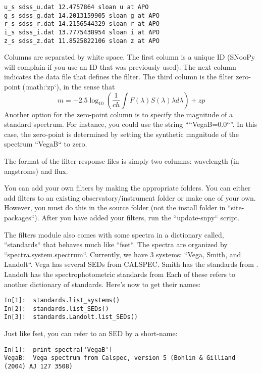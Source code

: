 \begin{verbatim}
u_s sdss_u.dat 12.4757864 sloan u at APO 
g_s sdss_g.dat 14.2013159905 sloan g at APO 
r_s sdss_r.dat 14.2156544329 sloan r at APO 
i_s sdss_i.dat 13.7775438954 sloan i at APO 
z_s sdss_z.dat 11.8525822106 sloan z at APO
\end{verbatim}Columns are separated by white space. The first column is a unique
ID (SNooPy will complain if you use an ID that was previously used).
The next column indicates the data file that defines the filter. The
third column is the filter zero-point (:math:`zp`), in the sense that 
\[
m=-2.5\log_{10}\left(\frac{1}{ch}\int F\left(\lambda\right)S\left(\lambda\right)\lambda d\lambda\right)+zp
\]
Another option for the zero-point column is to specify the magnitude
of a standard spectrum. For instance, you could use the string ````VegaB=0.0``''.
In this case, the zero-point is determined by setting the synthetic
magnitude of the spectrum ``VegaB`` \citep{2004AJ....127.3508B}
to zero. 

The format of the filter response files is simply two columns: wavelength
(in angstroms) and flux.

You can add your own filters by making the appropriate folders. You
can either add filters to an existing observatory/instrument folder
or make one of your own. However, you must do this in the source folder
(not the install folder in ``site-packages``). After you have
added your filters, run the ``update-snpy`` script.

The filters module also comes with some spectra in a dictionary called,
``standards`` that behaves much like ``fset``. The spectra
are organized by ``spectra.system.spectrum``. Currently, we have
3 systems: ``Vega, Smith, and Landolt``. Vega has several SEDs
from CALSPEC. Smith has the standards from \citet{1996AJ....111.1748F}.
Landolt has the spectrophotometric standards from \citet{2005PASP..117..810S}
Each of these refers to another dictionary of standards. Here's now
to get their names:

\begin{verbatim}
In[1]:  standards.list_systems()
In[2]:  standards.list_SEDs()
In[3]:  standards.Landolt.list_SEDs()
\end{verbatim}Just like fset, you can refer to an SED by a short-name:

\begin{verbatim}
In[1]:  print spectra['VegaB']
VegaB:  Vega spectrum from Calspec, version 5 (Bohlin & Gilliand (2004) AJ 127 3508)
\end{verbatim}

